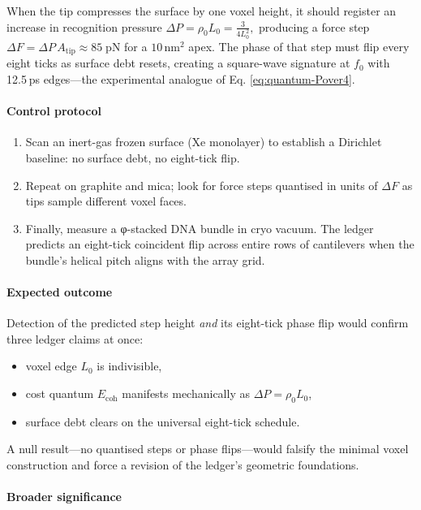 \documentclass[11pt,oneside]{book}
\begin{document}
When the tip compresses the surface by one voxel height, it should register an
increase in recognition pressure
\(
  \Delta P=\rho_{0}L_{0}=\frac{3}{4L_{0}^{2}},
\)
producing a force step
\(
  \Delta F=\Delta P\,A_{\text{tip}}
\approx 85\;\mathrm{pN}
\)
for a $10\,$nm$^{2}$ apex.  
The phase of that step must flip every eight ticks as surface debt resets,
creating a square-wave signature at $f_0$ with 12.5 ps edges—the experimental analogue of Eq. \eqref{eq:quantum-Pover4}.

\paragraph*{Control protocol}

\begin{enumerate}
\item Scan an inert-gas frozen surface (Xe monolayer) to establish a
  Dirichlet baseline: no surface debt, no eight-tick flip.
\item Repeat on graphite and mica; look for force steps quantised in units of
  $\Delta F$ as tips sample different voxel faces.
\item Finally, measure a φ-stacked DNA bundle in cryo vacuum.
  The ledger predicts an eight-tick coincident flip across entire rows of
  cantilevers when the bundle’s helical pitch aligns with the array grid.
\end{enumerate}

\paragraph*{Expected outcome}

Detection of the predicted step height \emph{and} its eight-tick phase flip
would confirm three ledger claims at once:

\begin{itemize}
\item voxel edge $L_{0}$ is indivisible,
\item cost quantum $E_{\text{coh}}$ manifests mechanically as
  $\Delta P=\rho_{0}L_{0}$,
\item surface debt clears on the universal eight-tick schedule.
\end{itemize}

A null result—no quantised steps or phase flips—would falsify the minimal
voxel construction and force a revision of the ledger’s geometric
foundations.

\paragraph*{Broader significance}
\end{document}
